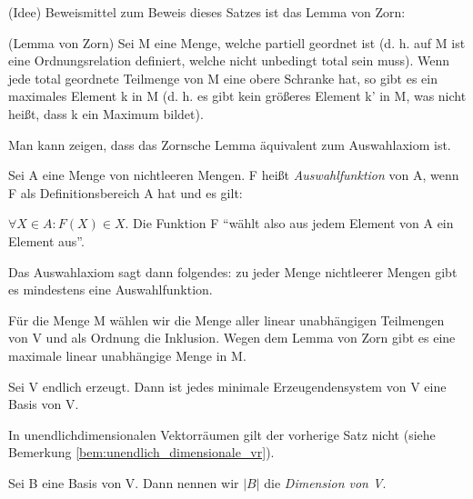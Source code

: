 \documentclass[10pt]{scrbook}
\begin{document}
\begin{bew} (Idee)
Beweismittel zum Beweis dieses Satzes ist das Lemma von Zorn:

\begin{Le} (Lemma von Zorn)
Sei M eine Menge, welche partiell geordnet ist (d. h. auf M ist eine Ordnungsrelation definiert, welche nicht unbedingt total sein muss). Wenn jede total geordnete Teilmenge von M eine obere Schranke hat, so gibt es ein maximales Element k in M (d. h. es gibt kein größeres Element k' in M, was nicht heißt, dass k ein Maximum bildet).
\end{Le}

\begin{Bem}
Man kann zeigen, dass das Zornsche Lemma äquivalent zum Auswahlaxiom ist.

Sei A eine Menge von nichtleeren Mengen. F heißt \emph{Auswahlfunktion} von A, wenn F als Definitionsbereich A hat und es gilt:

$\forall X\in A: F(X)\in X$. Die Funktion F "`wählt also aus jedem Element von A ein Element aus"'.

Das Auswahlaxiom sagt dann folgendes: zu jeder Menge nichtleerer Mengen gibt es mindestens eine Auswahlfunktion.
\end{Bem}

Für die Menge M wählen wir die Menge aller linear unabhängigen Teilmengen von V und als Ordnung die Inklusion. Wegen dem Lemma von Zorn gibt es eine maximale linear unabhängige Menge in M.
\end{bew}

\begin{Sa}
Sei V endlich erzeugt. Dann ist jedes minimale Erzeugendensystem von V eine Basis von V.
\end{Sa}

\begin{Bem}
In unendlichdimensionalen Vektorräumen gilt der vorherige Satz nicht (siehe Bemerkung \ref{bem:unendlich_dimensionale_vr}).
\end{Bem}

\begin{Def}
Sei B eine Basis von V. Dann nennen wir $\left|B\right|$ die \emph{Dimension von V}.
\end{Def}
\end{document}

